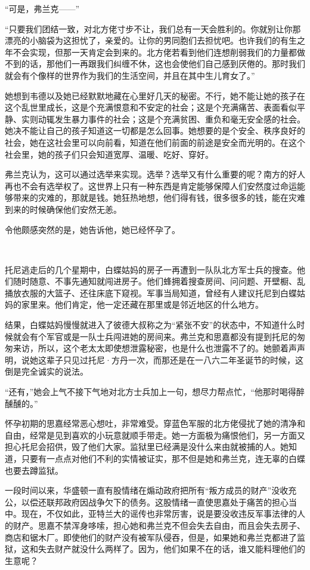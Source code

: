 \par “可是，弗兰克——”
\par “只要我们团结一致，对北方佬寸步不让，我们总有一天会胜利的。你就别让你那漂亮的小脑袋为这担忧了，亲爱的。让你的男同胞们去担忧吧。也许我们的有生之年不会实现，但那一天肯定会到来的。北方佬若看到他们连想削弱我们的力量都做不到的话，那他们一再跟我们纠缠不休，这也会使他们自己感到厌倦的。那时我们就会有个像样的世界作为我们的生活空间，并且在其中生儿育女了。”
\par 她想到韦德以及她已经默默地藏在心里好几天的秘密。不行，她不能让她的孩子在这个乱世里成长，这是个充满恨意和不安定的社会；这是个充满痛苦、表面看似平静、实则动辄发生暴力事件的社会；这是个充满贫困、重负和毫无安全感的社会。她决不能让自己的孩子知道这一切都是怎么回事。她想要的是个安全、秩序良好的社会，她在这社会里可以向前看，知道在他们前面的前途是安全而光明的。在这个社会里，她的孩子们只会知道宽厚、温暖、吃好、穿好。
\par 弗兰克认为，这可以通过选举来实现。选举？选举又有什么重要的呢？南方的好人再也不会有选举权了。这世界上只有一种东西是肯定能够保障人们安然度过命运能够带来的灾难的，那就是钱。她狂热地想，他们得有钱，很多很多的钱，能在灾难到来的时候确保他们安然无恙。
\par 令他颇感突然的是，她告诉他，她已经怀孕了。
\par  
\par 托尼逃走后的几个星期中，白蝶姑妈的房子一再遭到一队队北方军士兵的搜查。他们随时随意、不事先通知就闯进房子。他们蜂拥着搜查房间、问问题、开壁橱、乱捅放衣服的大篮子、还往床底下窥视。军事当局知道，曾经有人建议托尼到白蝶姑妈的家里来。他们肯定，他一定还藏在那里或是邻近地区的什么地方。
\par 结果，白蝶姑妈慢慢就进入了彼德大叔称之为“紧张不安”的状态中，不知道什么时候就会有个军官或是一队士兵闯进她的房间来。弗兰克和思嘉都没有提到托尼的匆匆来访，所以，这个老太太即使想泄露秘密，也是什么也泄露不了的。她颤着声声明，说她这辈子只见过托尼·方丹一次，而那还是在一八六二年圣诞节的时候，这倒是完全诚实的说法。
\par “还有，”她会上气不接下气地对北方士兵加上一句，想尽力帮点忙，“他那时喝得醉醺醺的。”
\par 怀孕初期的思嘉经常恶心想吐，非常难受。穿蓝色军服的北方佬侵扰了她的清净和自由，经常是见到喜欢的小玩意就顺手带走。她一方面极为痛恨他们，另一方面又担心托尼会招供，毁了他们大家。监狱里已经满是没什么来由就被捕的人。她知道，只要有一点点对他们不利的实情被证实，那不但是她和弗兰克，连无辜的白蝶也要去蹲监狱。
\par 一段时间以来，华盛顿一直有股情绪在煽动政府把所有“叛方成员的财产”没收充公，以偿还联邦政府因战争欠下的债务。这股情绪一直使思嘉处于痛苦的担心当中。现在，不仅如此，亚特兰大的谣传也非常厉害，说是要没收违反军事法律的人的财产。思嘉不禁浑身哆嗦，担心她和弗兰克不但会失去自由，而且会失去房子、商店和锯木厂。即使他们的财产没有被军队侵吞，但是，如果她和弗兰克都进了监狱，这和失去财产就没什么两样了。因为，他们如果不在的话，谁又能料理他们的生意呢？
